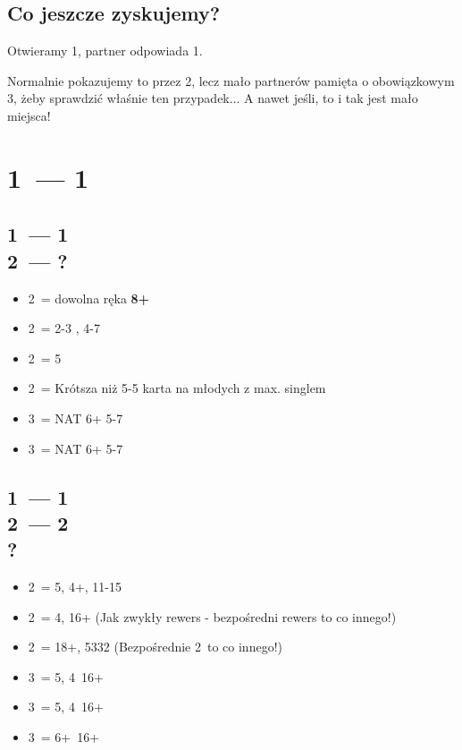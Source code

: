 \documentclass[12pt, a4paper]{article}
\begin{document}
\subsection*{Co jeszcze zyskujemy?}
Otwieramy 1\hearts, partner odpowiada 1\nt.
\begin{center}
\end{center}
Normalnie pokazujemy to przez 2\nt, lecz mało partnerów pamięta o obowiązkowym 3\clubs, żeby sprawdzić 
właśnie ten przypadek... A nawet jeśli, to i tak jest mało miejsca!




\pagebreak
\section*{1\hearts\ --- 1\ntx}

\subsection*{1\hearts\ --- 1\ntx \\ 2\clubs\ --- ?}
\begin{itemize}
    \item 2\diams\ = dowolna ręka \textbf{8+}
    \item 2\hearts\ = 2-3 \hearts, 4-7
    \item 2\spades\ = 5\diams \vimp
    \item 2\nt\ = Krótsza niż 5-5 karta na młodych z max. singlem \hearts \imp
    \item 3\clubs\ = NAT 6+ 5-7
    \item 3\diams\ = NAT 6+ 5-7
\end{itemize}

\subsection*{1\hearts\ --- 1\ntx \\ 2\clubs\ --- 2\diams \\ ?}
\begin{itemize}
    \item 2\hearts\ = 5\hearts, 4+\clubs, 11-15
    \item 2\spades\ = 4\spades, 16+ (Jak zwykły rewers - bezpośredni rewers to co innego!)
    \item 2\nt\ = 18+, 5332 (Bezpośrednie 2\nt\ to co innego!)
    \item 3\clubs\ = 5\hearts, 4\clubs\ 16+
    \item 3\diams\ = 5\hearts, 4\diams\ 16+
    \item 3\hearts\ = 6+\hearts\ 16+
\end{itemize}
\end{document}
